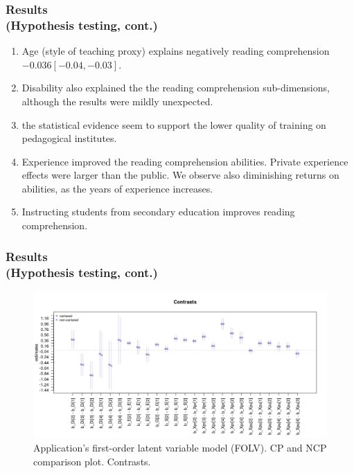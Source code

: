 \documentclass[nonav,sleutel]{beamer}
\begin{document}
	\begin{frame}
		\frametitle{Results \\
			(Hypothesis testing, cont.)}
		\begin{enumerate}
			\item Age (style of teaching proxy) explains negatively reading comprehension $-0.036[-0.04, -0.03]$.
			\item Disability also explained the the reading comprehension sub-dimensions, although the results were mildly unexpected. 
			\item the statistical evidence seem to support the lower quality of training on pedagogical institutes.
			\item Experience improved the reading comprehension abilities. Private experience effects were larger than the public. We observe also diminishing returns on abilities, as the years of experience increases.
			\item Instructing students from secondary education improves reading comprehension.
		\end{enumerate} 
	\end{frame}
	\begin{frame}
		\frametitle{Results \\
			(Hypothesis testing, cont.)}
		\begin{figure}[H]
			\centering
			\includegraphics[width=1\linewidth]{FOLV_recovery_contrast}
			\caption{Application’s first-order latent variable model (FOLV). CP and NCP comparison plot. Contrasts.}
			\label{fig:contrast_both}
		\end{figure}
	\end{frame}
\end{document}
